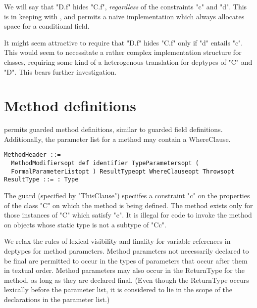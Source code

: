 We will say that \xcd"D.f" hides \xcd"C.f", {\em regardless} of the
constraints \xcd"c" and \xcd"d". This is in keeping with \Java, and
permits a naive implementation which always allocates space for a
conditional field.

\begin{rationale}
It might seem attractive to require that \xcd"D.f"
hides \xcd"C.f" only if \xcd"d" entails \xcd"c". This would seem
to necessitate a rather complex implementation structure for classes,
requiring some kind of a heterogenous translation for deptypes of \xcd"C"
and \xcd"D". This bears further investigation.
\end{rationale}

\section{Method definitions}

\Xten{} permits guarded method definitions, similar to guarded
field definitions. Additionally, the parameter list for a method may
contain a WhereClause.

\begin{verbatim}
MethodHeader ::= 
  MethodModifiersopt def identifier TypeParametersopt (
  FormalParameterListopt ) ResultTypeopt WhereClauseopt Throwsopt
ResultType ::= : Type
\end{verbatim}

The guard (specified by \xcd"ThisClause") speciifes a constraint \xcd"c" on the
properties of the class \xcd"C" on which the method is being defined. The
method exists only for those instances of \xcd"C" which satisfy \xcd"c".  It is
illegal for code to invoke the method on objects whose static type is
not a subtype of \xcd"C{c}".

We relax the rules of lexical visibility and finality for variable
references in deptypes for method parameters.  Method
parameters not necessarily declared to be final are permitted to occur
in the types of parameters that occur after them in textual
order. Method parameters may also occur in the ReturnType for the
method, as long as they are declared final. (Even though the ReturnType
occurs lexically before the parameter list, it is considered to lie in
the scope of the declarations in the parameter list.)

